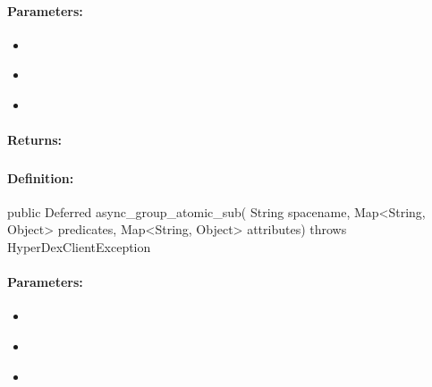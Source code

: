 \paragraph{Parameters:}
\begin{itemize}[noitemsep]
\item {}\\

\item {}\\

\item {}\\

\end{itemize}

\paragraph{Returns:}


\pagebreak
\subsubsection{}
\label{api:java:async_group_atomic_sub}


\paragraph{Definition:}
\begin{javacode}
public Deferred async_group_atomic_sub(
        String spacename,
        Map<String, Object> predicates,
        Map<String, Object> attributes) throws HyperDexClientException
\end{javacode}

\paragraph{Parameters:}
\begin{itemize}[noitemsep]
\item {}\\

\item {}\\

\item {}\\

\end{itemize}

